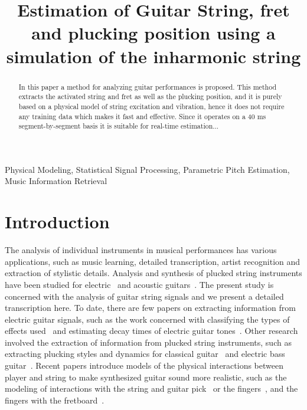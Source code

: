 \documentclass{article}
\title{Estimation of Guitar String, fret and plucking position using a simulation of the inharmonic string}
\begin{document}
\ninept
\maketitle

\begin{sloppy}

\begin{abstract}
  In this paper a method for analyzing guitar performances is proposed. This method extracts the activated string and fret as well as the plucking position, and it is purely based on a physical model of string excitation and vibration, hence it does not require any training data which makes it fast and effective. Since it operates on a 40 ms segment-by-segment basis it is suitable for real-time estimation...
\end{abstract}
%
\begin{keywords}
 Physical Modeling, Statistical Signal Processing, Parametric Pitch Estimation, Music Information Retrieval\vspace{-.8mm}
 \end{keywords}
%
\section{Introduction}
\label{sec:intro}

The analysis of individual instruments in musical performances has various applications, such as music learning, detailed transcription, artist recognition and extraction of stylistic details. Analysis and synthesis of plucked string instruments have been studied for electric~\cite{sullivan1990extending} and acoustic guitars~\cite{Karjalainen93towardshigh-quality,laurson2001methods}. The present study is concerned with the analysis of guitar string signals and we present a detailed transcription here. To date, there are few papers on extracting information from electric guitar signals, such as the work concerned with classifying the types of effects used~\cite{abesser2012feature} and estimating decay times of electric guitar tones~\cite{pate2014predicting}. Other research involved the extraction of information from plucked string instruments, such as extracting plucking styles and dynamics for classical guitar~\cite{erkut2000extraction} and electric bass guitar~\cite{abesser:automatic_string_detection_ml}. Recent papers introduce models of the physical interactions between player and string to make synthesized guitar sound more realistic, such as the modeling of interactions with the string and guitar pick~\cite{germain2009synthesis,evangelista2010player} or the fingers~\cite{poirot_nonlinear_interactions_with_string}, and the fingers with the fretboard~\cite{bilbao2015numerical}. 


\end{sloppy}
\end{document}
